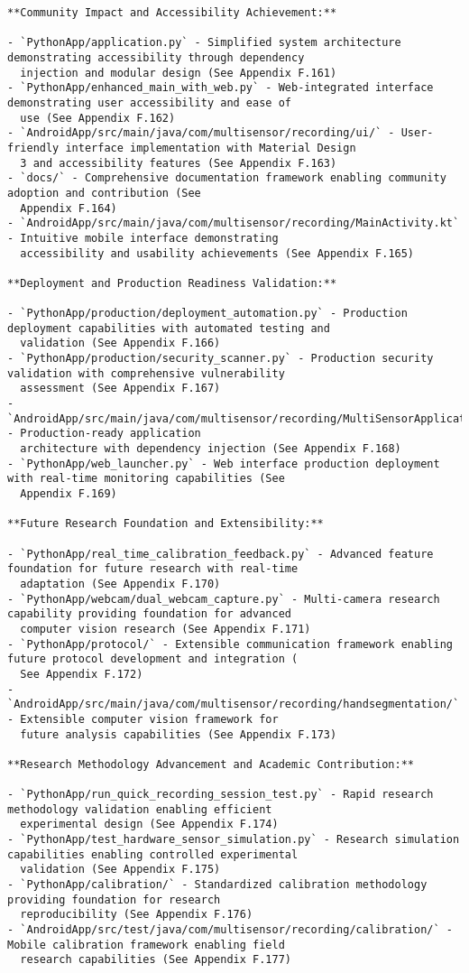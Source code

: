 \documentclass[11pt,a4paper]{report}
\begin{document}
\begin{verbatim}
**Community Impact and Accessibility Achievement:**

- `PythonApp/application.py` - Simplified system architecture demonstrating accessibility through dependency
  injection and modular design (See Appendix F.161)
- `PythonApp/enhanced_main_with_web.py` - Web-integrated interface demonstrating user accessibility and ease of
  use (See Appendix F.162)
- `AndroidApp/src/main/java/com/multisensor/recording/ui/` - User-friendly interface implementation with Material Design
  3 and accessibility features (See Appendix F.163)
- `docs/` - Comprehensive documentation framework enabling community adoption and contribution (See
  Appendix F.164)
- `AndroidApp/src/main/java/com/multisensor/recording/MainActivity.kt` - Intuitive mobile interface demonstrating
  accessibility and usability achievements (See Appendix F.165)

**Deployment and Production Readiness Validation:**

- `PythonApp/production/deployment_automation.py` - Production deployment capabilities with automated testing and
  validation (See Appendix F.166)
- `PythonApp/production/security_scanner.py` - Production security validation with comprehensive vulnerability
  assessment (See Appendix F.167)
- `AndroidApp/src/main/java/com/multisensor/recording/MultiSensorApplication.kt` - Production-ready application
  architecture with dependency injection (See Appendix F.168)
- `PythonApp/web_launcher.py` - Web interface production deployment with real-time monitoring capabilities (See
  Appendix F.169)

**Future Research Foundation and Extensibility:**

- `PythonApp/real_time_calibration_feedback.py` - Advanced feature foundation for future research with real-time
  adaptation (See Appendix F.170)
- `PythonApp/webcam/dual_webcam_capture.py` - Multi-camera research capability providing foundation for advanced
  computer vision research (See Appendix F.171)
- `PythonApp/protocol/` - Extensible communication framework enabling future protocol development and integration (
  See Appendix F.172)
- `AndroidApp/src/main/java/com/multisensor/recording/handsegmentation/` - Extensible computer vision framework for
  future analysis capabilities (See Appendix F.173)

**Research Methodology Advancement and Academic Contribution:**

- `PythonApp/run_quick_recording_session_test.py` - Rapid research methodology validation enabling efficient
  experimental design (See Appendix F.174)
- `PythonApp/test_hardware_sensor_simulation.py` - Research simulation capabilities enabling controlled experimental
  validation (See Appendix F.175)
- `PythonApp/calibration/` - Standardized calibration methodology providing foundation for research
  reproducibility (See Appendix F.176)
- `AndroidApp/src/test/java/com/multisensor/recording/calibration/` - Mobile calibration framework enabling field
  research capabilities (See Appendix F.177)


\end{verbatim}
\end{document}
